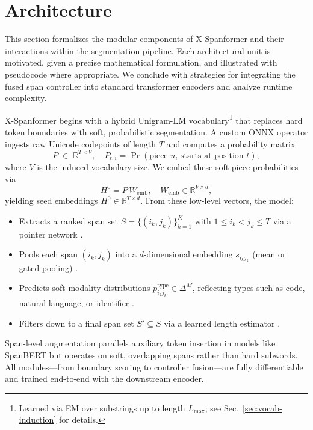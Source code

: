 \section{Architecture}

This section formalizes the modular components of X-Spanformer and their interactions within the segmentation pipeline.  Each architectural unit is motivated, given a precise mathematical formulation, and illustrated with pseudocode where appropriate.  We conclude with strategies for integrating the fused span controller into standard transformer encoders and analyze runtime complexity.

X-Spanformer begins with a hybrid Unigram-LM vocabulary\footnote{Learned via EM over substrings up to length \(L_{\max}\); see Sec.~\ref{sec:vocab-induction} for details.} that replaces hard token boundaries with soft, probabilistic segmentation.  A custom ONNX operator ingests raw Unicode codepoints of length \(T\) and computes a probability matrix  
\[
P \;\in\;\mathbb{R}^{T\times V}, 
\quad
P_{t,i} = \Pr(\text{piece }u_i\text{ starts at position }t),
\]
where \(V\) is the induced vocabulary size.  We embed these soft piece probabilities via  
\[
H^0 = P\,W_{\mathrm{emb}},
\quad
W_{\mathrm{emb}}\in\mathbb{R}^{V\times d},
\]
yielding seed embeddings \(H^0\in\mathbb{R}^{T\times d}\).  From these low-level vectors, the model:

\begin{itemize}
	\item Extracts a ranked span set \(S=\{(i_k,j_k)\}_{k=1}^K\) with \(1\le i_k<j_k\le T\) via a pointer network \cite{vinyals2015pointer}.
	\item Pools each span \((i_k,j_k)\) into a \(d\)-dimensional embedding \(s_{i_kj_k}\) (mean or gated pooling) \cite{tay2021charformer}.
	\item Predicts soft modality distributions \(p^\mathrm{type}_{i_kj_k}\in\Delta^M\), reflecting types such as code, natural language, or identifier \cite{lin2021codemix,li2021prefix}.
	\item Filters down to a final span set \(S'\subseteq S\) via a learned length estimator \cite{cheng2021masked}.
\end{itemize}

Span-level augmentation parallels auxiliary token insertion in models like SpanBERT \cite{joshi2020spanbert} but operates on soft, overlapping spans rather than hard subwords.  All modules—from boundary scoring to controller fusion—are fully differentiable and trained end-to-end with the downstream encoder.









